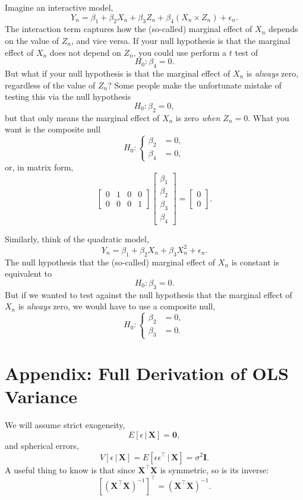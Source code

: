 \documentclass[12pt,oneside,openany]{book}
\begin{document}
Imagine an interactive model, \[
Y_n = \beta_1 + \beta_2 X_n + \beta_3 Z_n + \beta_4 (X_n \times Z_n) + \epsilon_n.
\] The interaction term captures how the (so-called) marginal effect of
\(X_n\) depends on the value of \(Z_n\), and vice versa. If your null
hypothesis is that the marginal effect of \(X_n\) does not depend on
\(Z_n\), you could use perform a \(t\) test of \[
H_0 : \beta_4 = 0.
\] But what if your null hypothesis is that the marginal effect of
\(X_n\) is \emph{always} zero, regardless of the value of \(Z_n\)? Some
people make the unfortunate mistake of testing this via the null
hypothesis \[
H_0 : \beta_2 = 0,
\] but that only means the marginal effect of \(X_n\) is zero \emph{when
\(Z_n = 0\)}. What you want is the composite null \[
H_0 : \left\{ \begin{aligned}
  \beta_2 &= 0, \\
  \beta_4 &= 0,
\end{aligned} \right.
\] or, in matrix form, \[
\begin{bmatrix}
  0 & 1 & 0 & 0 \\
  0 & 0 & 0 & 1
\end{bmatrix}
\begin{bmatrix}
  \beta_1 \\ \beta_2 \\ \beta_3 \\ \beta_4
\end{bmatrix}
=
\begin{bmatrix}
  0 \\ 0
\end{bmatrix}.
\]

Similarly, think of the quadratic model, \[
Y_n = \beta_1 + \beta_2 X_n + \beta_3 X_n^2 + \epsilon_n.
\] The null hypothesis that the (so-called) marginal effect of \(X_n\)
is constant is equivalent to \[
H_0 : \beta_3 = 0.
\] But if we wanted to test against the null hypothesis that the
marginal effect of \(X_n\) is \emph{always} zero, we would have to use a
composite null, \[
H_0 : \left\{ \begin{aligned}
  \beta_2 &= 0, \\
  \beta_3 &= 0.
\end{aligned} \right.
\]

\section{Appendix: Full Derivation of OLS
Variance}\label{appendix-full-derivation-of-ols-variance}

We will assume strict exogeneity, \[
E [\epsilon \,|\, \mathbf{X}] = \mathbf{0},
\] and spherical errors, \[
V [\epsilon \,|\, \mathbf{X}] = E [\epsilon \epsilon^\top \,|\, \mathbf{X}] = \sigma^2 \mathbf{I}.
\] A useful thing to know is that since \(\mathbf{X}^\top \mathbf{X}\)
is symmetric, so is its inverse: \[
[(\mathbf{X}^\top \mathbf{X})^{-1}]^\top = (\mathbf{X}^\top \mathbf{X})^{-1}.
\]
\end{document}
